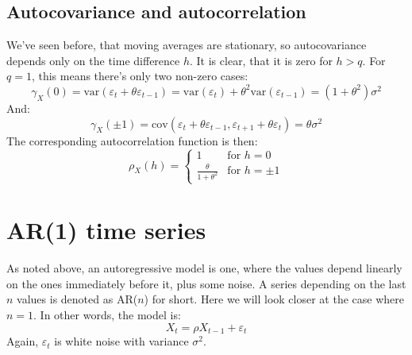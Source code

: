 \documentclass[12pt, a4paper]{article}
\numberwithin{equation}{section}
\begin{document}
\subsection{Autocovariance and autocorrelation}
We've seen before, that moving averages are stationary, so autocovariance depends only on the time difference $h$. It is clear, that it is zero for $h>q$. For $q=1$, this means there's only two non-zero cases:
\begin{equation}
\gamma_X(0)=\textrm{var}(\varepsilon_t+\theta\varepsilon_{t-1})=\textrm{var}(\varepsilon_t)+\theta^2\textrm{var}(\varepsilon_{t-1})=(1+\theta^2)\sigma^2
\end{equation}
And:
\begin{equation}
\gamma_X(\pm 1)=\textrm{cov}(\varepsilon_t+\theta\varepsilon_{t-1},\varepsilon_{t+1}+\theta\varepsilon_t)=\theta\sigma^2
\end{equation}
The corresponding autocorrelation function is then:
\begin{equation}
\rho_X(h)=
\begin{cases}
1 & \textrm{for }h=0 \\
\frac{\theta}{1+\theta^2} & \textrm{for }h=\pm 1
\end{cases}
\end{equation}


\section{AR(1) time series}
As noted above, an autoregressive model is one, where the values depend linearly on the ones immediately before it, plus some noise. A series depending on the last $n$ values is denoted as AR($n$) for short. Here we will look closer at the case where $n=1$. In other words, the model is:
\begin{equation}
X_t=\rho X_{t-1}+\varepsilon_t
\end{equation}
Again, $\varepsilon_t$ is white noise with variance $\sigma^2$.
\end{document}
